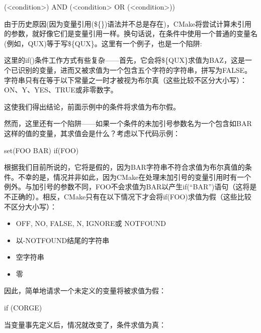 \begin{shell}
(<condition>) AND (<condition> OR (<condition>))
\end{shell}


由于历史原因(因为变量引用(\$\{\})语法并不总是存在)，CMake将尝试计算未引用的参数，就好像它们是变量引用一样。换句话说，在条件中使用一个普通的变量名(例如，QUX)等于写\$\{QUX\}。这里有一个例子，也是一个陷阱:


这里的if()条件工作方式有些复杂——首先，它会将\$\{QUX\}求值为BAZ，这是一个已识别的变量，进而又被求值为一个包含五个字符的字符串，拼写为FALSE。字符串只有在等于以下常量之一时才被视为布尔真（这些比较不区分大小写）：ON、Y、YES、TRUE或非零数字。

这使我们得出结论，前面示例中的条件将求值为布尔假。

然而，这里还有一个陷阱——如果一个条件的未加引号参数名为一个包含如BAR这样的值的变量，其求值会是什么？考虑以下代码示例：

\begin{cmake}
set(FOO BAR)
if(FOO)
\end{cmake}

根据我们目前所说的，它将是假的，因为BAR字符串不符合求值为布尔真值的条件。不幸的是，情况并非如此，因为CMake在处理未加引号的变量引用时有一个例外。与加引号的参数不同，FOO不会求值为BAR以产生if(“BAR”)语句（这将是不正确的）。相反，CMake只有在以下情况下才会将if(FOO)求值为假（这些比较不区分大小写）：

\begin{itemize}
\item
OFF, NO, FALSE, N, IGNORE或 NOTFOUND

\item
以-NOTFOUND结尾的字符串

\item
空字符串

\item
零
\end{itemize}

因此，简单地请求一个未定义的变量将被求值为假：

\begin{cmake}
if (CORGE)
\end{cmake}

当变量事先定义后，情况就改变了，条件求值为真：

